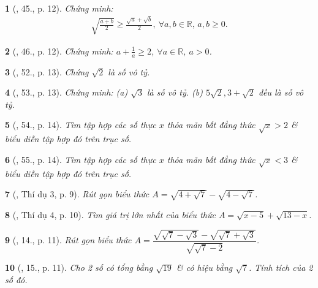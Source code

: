 \documentclass{article}
\newtheorem{baitoan}{}
\begin{document}
\begin{baitoan}[\cite{SBT_Toan_9_tap_1}, 45., p. 12]
	Chứng minh:
	\begin{align*}
		\sqrt{\frac{a + b}{2}}\ge\frac{\sqrt{a} + \sqrt{b}}{2},\ \forall a,b\in\mathbb{R},\,a,b\ge0.
	\end{align*}
\end{baitoan}

\begin{baitoan}[\cite{SBT_Toan_9_tap_1}, 46., p. 12]
	Chứng minh: $a + \frac{1}{a}\ge2$, $\forall a\in\mathbb{R}$, $a > 0$.
\end{baitoan}

\begin{baitoan}[\cite{SBT_Toan_9_tap_1}, 52., p. 13]
	Chứng $\sqrt{2}$ là số vô tỷ.
\end{baitoan}

\begin{baitoan}[\cite{SBT_Toan_9_tap_1}, 53., p. 13]
	Chứng minh: (a) $\sqrt{3}$ là số vô tỷ. (b) $5\sqrt{2},3 + \sqrt{2}$ đều là số vô tỷ.
\end{baitoan}

\begin{baitoan}[\cite{SBT_Toan_9_tap_1}, 54., p. 14]
	Tìm tập hợp các số thực $x$ thỏa mãn bất đẳng thức $\sqrt{x} > 2$ \& biểu diễn tập hợp đó trên trục số.
\end{baitoan}

\begin{baitoan}[\cite{SBT_Toan_9_tap_1}, 55., p. 14]
	Tìm tập hợp các số thực $x$ thỏa mãn bất đẳng thức $\sqrt{x} < 3$ \& biểu diễn tập hợp đó trên trục số.
\end{baitoan}

\begin{baitoan}[\cite{Tuyen_Toan_9_old}, Thí dụ 3, p. 9]
	Rút gọn biểu thức $A = \sqrt{4 + \sqrt{7}} - \sqrt{4 - \sqrt{7}}$.
\end{baitoan}

\begin{baitoan}[\cite{Tuyen_Toan_9_old}, Thí dụ 4, p. 10]
	Tìm giá trị lớn nhất của biểu thức $A = \sqrt{x - 5} + \sqrt{13 - x}$.
\end{baitoan}

\begin{baitoan}[\cite{Tuyen_Toan_9_old}, 14., p. 11]
	Rút gọn biểu thức $A = \dfrac{\sqrt{\sqrt{7} - \sqrt{3}} - \sqrt{\sqrt{7} + \sqrt{3}}}{\sqrt{\sqrt{7} - 2}}$.
\end{baitoan}

\begin{baitoan}[\cite{Tuyen_Toan_9_old}, 15., p. 11]
	Cho 2 số có tổng bằng $\sqrt{19}$ \& có hiệu bằng $\sqrt{7}$. Tính tích của 2 số đó.
\end{baitoan}
\end{document}
